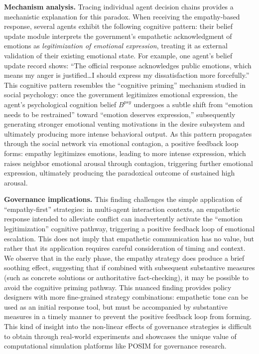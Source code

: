 \documentclass[a4paper,fleqn]{cas-dc}
\begin{document}
\textbf{Mechanism analysis.} Tracing individual agent decision chains provides a mechanistic explanation for this paradox. When receiving the empathy-based response, several agents exhibit the following cognitive pattern: their belief update module interprets the government's empathetic acknowledgment of emotions as \textit{legitimization of emotional expression}, treating it as external validation of their existing emotional state. For example, one agent's belief update record shows: ``The official response acknowledges public emotions, which means my anger is justified\ldots I should express my dissatisfaction more forcefully.'' This cognitive pattern resembles the ``cognitive priming'' mechanism studied in social psychology: once the government legitimizes emotional expression, the agent's psychological cognition belief $B^{psy}$ undergoes a subtle shift from ``emotion needs to be restrained'' toward ``emotion deserves expression,'' subsequently generating stronger emotional venting motivations in the desire subsystem and ultimately producing more intense behavioral output. As this pattern propagates through the social network via emotional contagion, a positive feedback loop forms: empathy legitimizes emotions, leading to more intense expression, which raises neighbor emotional arousal through contagion, triggering further emotional expression, ultimately producing the paradoxical outcome of sustained high arousal.

\textbf{Governance implications.} This finding challenges the simple application of ``empathy-first'' strategies: in multi-agent interaction contexts, an empathetic response intended to alleviate conflict can inadvertently activate the ``emotion legitimization'' cognitive pathway, triggering a positive feedback loop of emotional escalation. This does not imply that empathetic communication has no value, but rather that its application requires careful consideration of timing and context. We observe that in the early phase, the empathy strategy does produce a brief soothing effect, suggesting that if combined with subsequent substantive measures (such as concrete solutions or authoritative fact-checking), it may be possible to avoid the cognitive priming pathway. This nuanced finding provides policy designers with more fine-grained strategy combinations: empathetic tone can be used as an initial response tool, but must be accompanied by substantive measures in a timely manner to prevent the positive feedback loop from forming. This kind of insight into the non-linear effects of governance strategies is difficult to obtain through real-world experiments and showcases the unique value of computational simulation platforms like POSIM for governance research.
\end{document}
